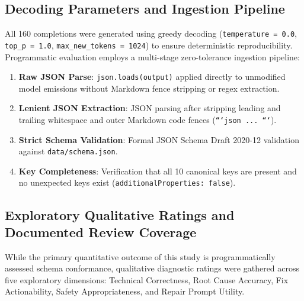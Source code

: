 \documentclass[11pt,a4paper]{article}
\begin{document}
\subsection{Decoding Parameters and Ingestion Pipeline}
All 160 completions were generated using greedy decoding (\texttt{temperature = 0.0}, \texttt{top\_p = 1.0}, \texttt{max\_new\_tokens = 1024}) to ensure deterministic reproducibility. Programmatic evaluation employs a multi-stage zero-tolerance ingestion pipeline:
\begin{enumerate}
    \item \textbf{Raw JSON Parse}: \texttt{json.loads(output)} applied directly to unmodified model emissions without Markdown fence stripping or regex extraction.
    \item \textbf{Lenient JSON Extraction}: JSON parsing after stripping leading and trailing whitespace and outer Markdown code fences (\texttt{```json ... ```}).
    \item \textbf{Strict Schema Validation}: Formal JSON Schema Draft 2020-12 validation against \texttt{data/schema.json}.
    \item \textbf{Key Completeness}: Verification that all 10 canonical keys are present and no unexpected keys exist (\texttt{additionalProperties: false}).
\end{enumerate}

\subsection{Exploratory Qualitative Ratings and Documented Review Coverage}
While the primary quantitative outcome of this study is programmatically assessed schema conformance, qualitative diagnostic ratings were gathered across five exploratory dimensions: Technical Correctness, Root Cause Accuracy, Fix Actionability, Safety Appropriateness, and Repair Prompt Utility.
\end{document}
